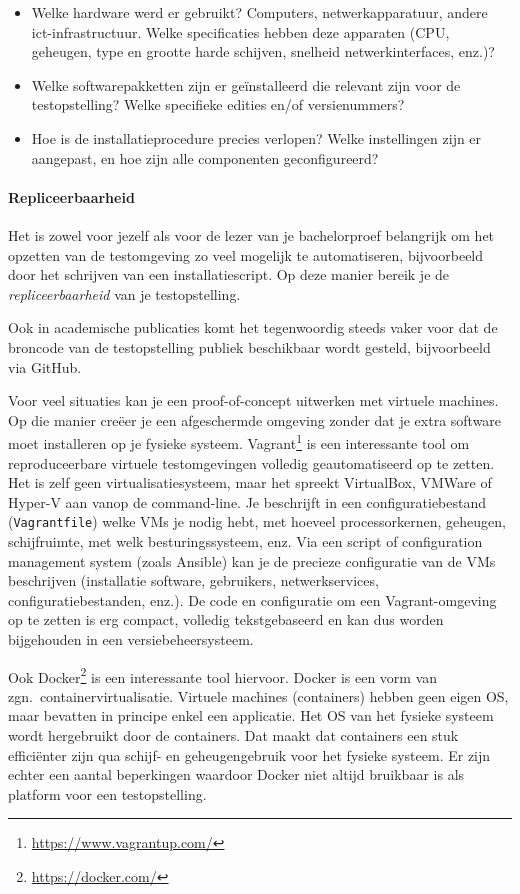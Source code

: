\begin{itemize}
  \item Welke hardware werd er gebruikt? Computers, netwerkapparatuur, andere ict-infrastructuur. Welke specificaties hebben deze apparaten (CPU, geheugen, type en grootte harde schijven, snelheid netwerkinterfaces, enz.)?
  \item Welke softwarepakketten zijn er geïnstalleerd die relevant zijn voor de testopstelling? Welke specifieke edities en/of versienummers?
  \item Hoe is de installatieprocedure precies verlopen? Welke instellingen zijn er aangepast, en hoe zijn alle componenten geconfigureerd?
\end{itemize}

\paragraph{Repliceerbaarheid}%

Het is zowel voor jezelf als voor de lezer van je bachelorproef belangrijk om het opzetten van de testomgeving zo veel mogelijk te automatiseren, bijvoorbeeld door het schrijven van een installatiescript. Op deze manier bereik je de \textit{repliceerbaarheid} van je testopstelling.

Ook in academische publicaties komt het tegenwoordig steeds vaker voor dat de broncode van de testopstelling publiek beschikbaar wordt gesteld, bijvoorbeeld via GitHub.

Voor veel situaties kan je een proof-of-concept uitwerken met virtuele machines. Op die manier creëer je een afgeschermde omgeving zonder dat je extra software moet installeren op je fysieke systeem. Vagrant\footnote{\url{https://www.vagrantup.com/}} is een interessante tool om reproduceerbare virtuele testomgevingen volledig geautomatiseerd op te zetten. Het is zelf geen virtualisatiesysteem, maar het spreekt VirtualBox, VMWare of Hyper-V aan vanop de command-line. Je beschrijft in een configuratiebestand (\texttt{Vagrantfile}) welke VMs je nodig hebt, met hoeveel processorkernen, geheugen, schijfruimte, met welk besturingssysteem, enz. Via een script of configuration management system (zoals Ansible) kan je de precieze configuratie van de VMs beschrijven (installatie software, gebruikers, netwerkservices, configuratiebestanden, enz.). De code en configuratie om een Va\-grant-\-omgeving op te zetten is erg compact, volledig tekstgebaseerd en kan dus worden bijgehouden in een versiebeheersysteem.

Ook Docker\footnote{\url{https://docker.com/}} is een interessante tool hiervoor. Docker is een vorm van zgn.~containervirtualisatie. Virtuele machines (containers) hebben geen eigen OS, maar bevatten in principe enkel een applicatie. Het OS van het fysieke systeem wordt hergebruikt door de containers. Dat maakt dat containers een stuk efficiënter zijn qua schijf- en geheugengebruik voor het fysieke systeem. Er zijn echter een aantal beperkingen waardoor Docker niet altijd bruikbaar is als platform voor een testopstelling.

